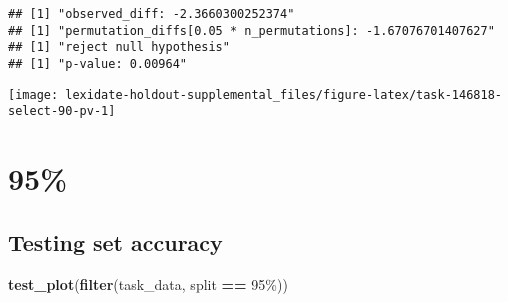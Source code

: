 \documentclass[
]{book}
\newenvironment{Shaded}{\begin{snugshade}}{\end{snugshade}}
\newcommand{\AttributeTok}[1]{\textcolor[rgb]{0.13,0.29,0.53}{#1}}
\newcommand{\DecValTok}[1]{\textcolor[rgb]{0.00,0.00,0.81}{#1}}
\newcommand{\FunctionTok}[1]{\textcolor[rgb]{0.13,0.29,0.53}{\textbf{#1}}}
\newcommand{\NormalTok}[1]{#1}
\newcommand{\OtherTok}[1]{\textcolor[rgb]{0.56,0.35,0.01}{#1}}
\newcommand{\SpecialCharTok}[1]{\textcolor[rgb]{0.81,0.36,0.00}{\textbf{#1}}}
\newcommand{\StringTok}[1]{\textcolor[rgb]{0.31,0.60,0.02}{#1}}
\begin{document}
\begin{Shaded}
\end{Shaded}

\begin{verbatim}
## [1] "observed_diff: -2.3660300252374"
## [1] "permutation_diffs[0.05 * n_permutations]: -1.67076701407627"
## [1] "reject null hypothesis"
## [1] "p-value: 0.00964"
\end{verbatim}

\texttt{[image: lexidate-holdout-supplemental\_files/figure-latex/task-146818-select-90-pv-1]}

\hypertarget{section-4}{%
\section{95\%}\label{section-4}}

\hypertarget{testing-set-accuracy-4}{%
\subsection{Testing set accuracy}\label{testing-set-accuracy-4}}

\begin{Shaded}
\begin{Highlighting}[]
\FunctionTok{test\_plot}\NormalTok{(}\FunctionTok{filter}\NormalTok{(task\_data, split }\SpecialCharTok{==} \StringTok{\textquotesingle{}95\%\textquotesingle{}}\NormalTok{))}
\end{Highlighting}
\end{Shaded}
\end{document}
